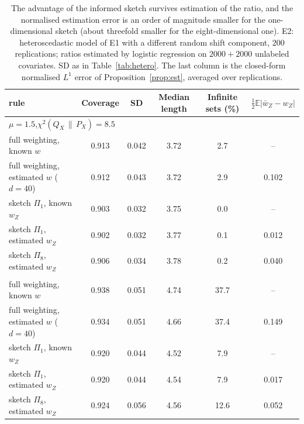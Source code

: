 \documentclass[11pt,a4paper]{article}
\newcommand{\PX}{P_X}
\newcommand{\QX}{Q_X}
\newcommand{\chisq}{\chi^2(\QX\,\|\,\PX)}
\newcommand{\E}{\mathbb{E}}
\theoremstyle{plain}
\theoremstyle{definition}
\theoremstyle{remark}
\begin{document}
\begin{table}[!htbp]\centering\footnotesize\setlength{\tabcolsep}{5pt}
\begin{tabular}{lccccc}
\toprule
rule & Coverage & SD & Median length & Infinite sets (\%) & $\tfrac12\E|\bar w_Z-w_Z|$\\
\midrule
\multicolumn{6}{l}{$\mu=1.5$,\quad $\chisq=8.5$}\\
full weighting, known $w$ & 0.913 & 0.042 & 3.72 & 2.7 & --\\
full weighting, estimated $w$ ($d=40$) & 0.912 & 0.043 & 3.72 & 2.9 & 0.102\\
sketch $\Pi_1$, known $w_Z$ & 0.903 & 0.032 & 3.75 & 0.0 & --\\
sketch $\Pi_1$, estimated $w_Z$ & 0.902 & 0.032 & 3.77 & 0.1 & 0.012\\
sketch $\Pi_8$, estimated $w_Z$ & 0.906 & 0.034 & 3.78 & 0.2 & 0.040\\
\addlinespace
\multicolumn{6}{l}{$\mu=2.5$,\quad $\chisq=517$}\\
full weighting, known $w$ & 0.938 & 0.051 & 4.74 & 37.7 & --\\
full weighting, estimated $w$ ($d=40$) & 0.934 & 0.051 & 4.66 & 37.4 & 0.149\\
sketch $\Pi_1$, known $w_Z$ & 0.920 & 0.044 & 4.52 & 7.9 & --\\
sketch $\Pi_1$, estimated $w_Z$ & 0.920 & 0.044 & 4.54 & 7.9 & 0.017\\
sketch $\Pi_8$, estimated $w_Z$ & 0.924 & 0.056 & 4.56 & 12.6 & 0.052\\
\bottomrule
\end{tabular}
\caption{The advantage of the informed sketch survives estimation of the ratio, and the normalised estimation error is an order of magnitude smaller for the one-dimensional sketch (about threefold smaller for the eight-dimensional one). E2: heteroscedastic model of E1 with a different random shift component, $200$ replications; ratios estimated by logistic regression on $2000+2000$ unlabeled covariates. SD as in Table~\ref{tab:hetero}. The last column is the closed-form normalised $L^1$ error of Proposition~\ref{prop:est}, averaged over replications.}\label{tab:est}
\end{table}

\FloatBarrier
\end{document}
